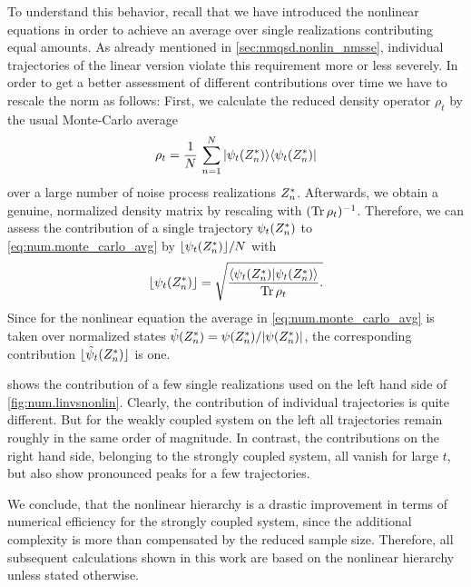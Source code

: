 To understand this behavior, recall that we have introduced the nonlinear equations in order to achieve an average over single realizations contributing equal amounts.
As already mentioned in \autoref{sec:nmqsd.nonlin_nmsse}, individual trajectories of the linear version violate this requirement more or less severely.
In order to get a better assessment of different contributions over time we have to rescale the norm as follows:
First, we calculate the reduced density operator $\rho_t$ by the usual Monte-Carlo average
\begin{equation}
  \rho_t = \frac{1}{N}\,\sum_{n=1}^N | \psi_t({Z}^*_n) \rangle \langle \psi_t({Z}^*_n) |
  \label{eq:num.monte_carlo_avg}
\end{equation}
over a large number of noise process realizations ${Z}^*_n$.
Afterwards, we obtain a genuine, normalized density matrix by rescaling with $(\operatorname{Tr}{} \rho_t)^{-1}$.
Therefore, we can assess the contribution of a single trajectory $\psi_t({Z}^*_n)$ to \autoref{eq:num.monte_carlo_avg} by $\lfloor \psi_t({Z}^*_n) \rfloor / N$ with
\begin{equation}
  \lfloor \psi_t(\ZZ_n) \rfloor = \sqrt{%
    \frac{\braket{\psi_t(\ZZ_n)}{\psi_t(\ZZ_n)}}{\Tr{} \rho_t}.
  }
  \label{eq:num.contribution}
\end{equation}
Since for the nonlinear equation the average in \autoref{eq:num.monte_carlo_avg} is taken over normalized states $\tilde\psi({Z}^*_n) = \psi({Z}^*_n) / \vert \psi({Z}^*_n) \vert$, the corresponding contribution $\lfloor \tilde\psi_t({Z}^*_n) \rfloor$ is one.

 shows the contribution of a few single realizations used on the left hand side of \autoref{fig:num.linvsnonlin}.
Clearly, the contribution of individual trajectories is quite different.
But for the weakly coupled system on the left all trajectories remain roughly in the same order of magnitude.
In contrast, the contributions on the right hand side, belonging to the strongly coupled system, all vanish for large $t$, but also show pronounced peaks for a few trajectories.

We conclude, that the nonlinear hierarchy is a drastic improvement in terms of numerical efficiency for the strongly coupled system, since the additional complexity is more than compensated by the reduced sample size.
Therefore, all subsequent calculations shown in this work are based on the nonlinear hierarchy unless stated otherwise.


